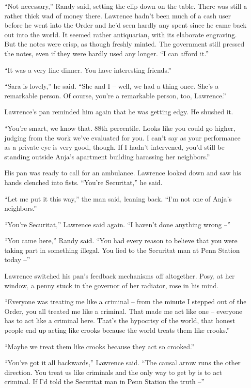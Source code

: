 “Not necessary,” Randy said, setting the clip down on the table. 
There was still a rather thick wad of money there. Lawrence hadn't been 
much of a cash user before he went into the Order and he'd seen hardly 
any spent since he came back out into the world. It seemed rather 
antiquarian, with its elaborate engraving. But the notes were crisp, as 
though freshly minted. The government still pressed the notes, even if 
they were hardly used any longer. “I can afford it.”

“It was a very fine dinner. You have interesting friends.”

“Sara is lovely,” he said. “She and I -- well, we had a thing 
once. She's a remarkable person. Of course, you're a remarkable person, 
too, Lawrence.”

Lawrence's pan reminded him again that he was getting edgy. He shushed 
it.

“You're smart, we know that. 88th percentile. Looks like you could go 
higher, judging from the work we've evaluated for you. I can't say as 
your performance as a private eye is very good, though. If I hadn't 
intervened, you'd still be standing outside Anja's apartment building 
harassing her neighbors.”

His pan was ready to call for an ambulance. Lawrence looked down and 
saw his hands clenched into fists. “You're Securitat,” he said.

“Let me put it this way,” the man said, leaning back. “I'm not 
one of Anja's neighbors.”

“You're Securitat,” Lawrence said again. “I haven't done anything 
wrong --”

“You came here,” Randy said. “You had every reason to believe 
that you were taking part in something illegal. You lied to the 
Securitat man at Penn Station today --”

Lawrence switched his pan's feedback mechanisms off altogether. Posy, 
at her window, a penny stuck in the governor of her radiator, rose in 
his mind.

“Everyone was treating me like a criminal -- from the minute I 
stepped out of the Order, you all treated me like a criminal. That made 
me act like one -- everyone has to act like a criminal here. That's the 
hypocrisy of the world, that honest people end up acting like crooks 
because the world treats them like crooks.”

“Maybe we treat them like crooks because they act so crooked.”

“You've got it all backwards,” Lawrence said. “The causal arrow 
runs the other direction. You treat us like criminals and the only way 
to get by is to act criminal. If I'd told the Securitat man in Penn 
Station the truth --”

